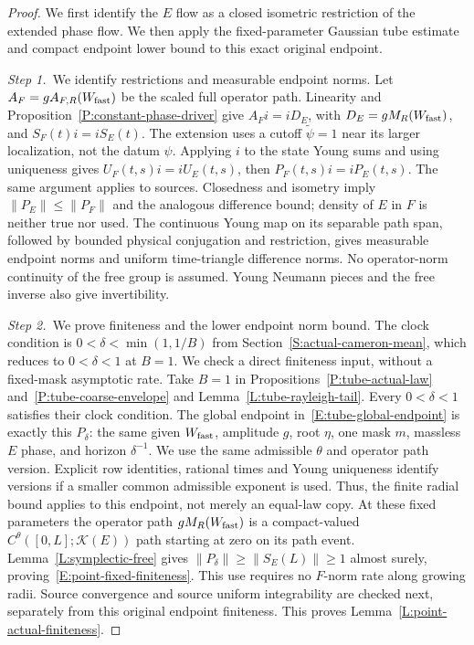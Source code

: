 \begin{proof}
  We first identify the $E$ flow as a closed isometric restriction of the
  extended phase flow. We then apply the fixed-parameter Gaussian tube
  estimate and compact endpoint lower bound to this exact original endpoint.


  \medskip
  \noindent\textit{Step 1.~}We identify restrictions and measurable endpoint
  norms.
  Let $A_F = gA_{F,R}(W_{\rm fast})$ be the scaled full operator path. Linearity
  and Proposition~\ref{P:constant-phase-driver} give $A_Fi = iD_E$, with $D_E =
  gM_R(W_{\rm fast})$, and $S_F(t)i = iS_E(t)$. The extension uses a cutoff
  $\widetilde{\psi} = 1$ near its larger localization, not the datum $\psi$.
  Applying $i$ to the state Young sums and using uniqueness gives $U_F(t,s)i =
  iU_E(t,s)$, then $P_F(t,s)i = iP_E(t,s)$. The same argument applies to
  sources. Closedness and isometry imply $\|P_E\| \le \|P_F\|$ and the analogous
  difference bound; density of $E$ in $F$ is neither true nor used. The
  continuous Young map on its separable path span, followed by bounded physical
  conjugation and restriction, gives measurable endpoint norms and uniform
  time-triangle difference norms. No operator-norm continuity of the free group
  is assumed. Young Neumann pieces and the free inverse also give invertibility.


  \medskip
  \noindent\textit{Step 2.~}We prove finiteness and the lower endpoint norm
  bound.
  The clock condition is $0<\delta<\min(1,1/B)$ from
  Section~\ref{S:actual-cameron-mean}, which reduces to $0<\delta<1$ at $B=1$.
  We check a direct finiteness input, without a fixed-mask asymptotic rate. Take
  $B = 1$ in Propositions~\ref{P:tube-actual-law}
  and~\ref{P:tube-coarse-envelope} and Lemma~\ref{L:tube-rayleigh-tail}. Every
  $0 < \delta < 1$ satisfies their clock condition. The global endpoint
  in~\eqref{E:tube-global-endpoint} is exactly this $P_\delta$: the same given
  $W_{\rm fast}$, amplitude $g$, root $\eta$, one mask $m$, massless $E$ phase,
  and horizon $\delta^{-1}$. We use the same admissible $\theta$ and operator
  path version. Explicit row identities, rational times and Young uniqueness
  identify versions if a smaller common admissible exponent is used. Thus, the
  finite radial bound applies to this endpoint, not merely an equal-law copy. At
  these fixed parameters the operator path $gM_R(W_{\rm fast})$ is a
  compact-valued $C^\theta([0,L];\mathcal{K}(E))$ path starting at zero on its
  path event. Lemma~\ref{L:symplectic-free} gives $\|P_\delta\| \ge \|S_E(L)\|
  \ge 1$ almost surely, proving~\eqref{E:point-fixed-finiteness}. This use
  requires no $F$-norm rate along growing radii. Source convergence and source
  uniform integrability are checked next, separately from this original endpoint
  finiteness. This proves Lemma~\ref{L:point-actual-finiteness}.
\end{proof}

